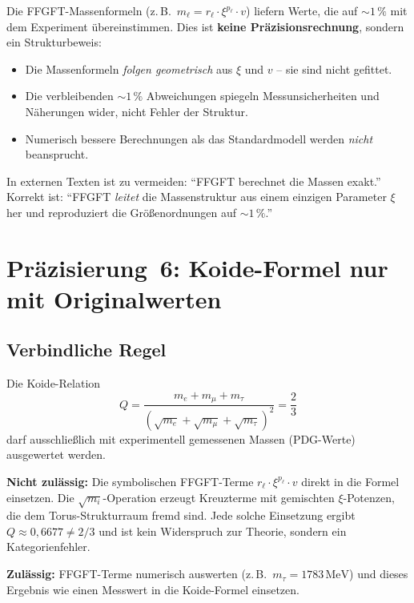 Die FFGFT-Massenformeln (z.\,B.\ $m_\ell = r_\ell \cdot \xi^{p_\ell} \cdot v$)
liefern Werte, die auf $\sim 1\,\%$ mit dem Experiment übereinstimmen.
Dies ist \textbf{keine Präzisionsrechnung}, sondern ein Strukturbeweis:

\begin{itemize}
  \item Die Massenformeln \emph{folgen geometrisch} aus $\xi$ und $v$
    -- sie sind nicht gefittet.
  \item Die verbleibenden $\sim 1\,\%$ Abweichungen spiegeln
    Messunsicherheiten und Näherungen wider, nicht Fehler der Struktur.
  \item Numerisch bessere Berechnungen als das Standardmodell werden
    \emph{nicht} beansprucht.
\end{itemize}

In externen Texten ist zu vermeiden: \enquote{FFGFT berechnet die Massen exakt.}
Korrekt ist: \enquote{FFGFT \emph{leitet} die Massenstruktur aus einem einzigen
Parameter $\xi$ her und reproduziert die Größenordnungen auf $\sim 1\,\%$.}

\section{Präzisierung~6: Koide-Formel nur mit Originalwerten}

\subsection*{Verbindliche Regel}

Die Koide-Relation
\begin{equation}
  Q = \frac{m_e + m_\mu + m_\tau}{(\sqrt{m_e}+\sqrt{m_\mu}+\sqrt{m_\tau})^2} = \frac{2}{3}
  \tag{190.11}
\end{equation}
darf ausschließlich mit experimentell gemessenen Massen (PDG-Werte) ausgewertet werden.

\textbf{Nicht zulässig:} Die symbolischen FFGFT-Terme $r_\ell \cdot \xi^{p_\ell} \cdot v$
direkt in die Formel einsetzen. Die $\sqrt{m_i}$-Operation erzeugt Kreuzterme
mit gemischten $\xi$-Potenzen, die dem Torus-Strukturraum fremd sind.
Jede solche Einsetzung ergibt $Q \approx 0{,}6677 \neq 2/3$ und ist
kein Widerspruch zur Theorie, sondern ein Kategorienfehler.

\textbf{Zulässig:} FFGFT-Terme numerisch auswerten
(z.\,B.\ $m_\tau = 1783\,\text{MeV}$) und dieses Ergebnis
wie einen Messwert in die Koide-Formel einsetzen.

